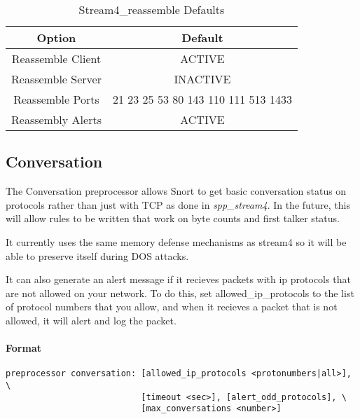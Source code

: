 \documentclass[english]{report}
\begin{document}
%
\begin{table}[!hbpt]

\caption{Stream4\_reassemble Defaults\label{stream4 reassemble defaults}}

\begin{center}\begin{tabular}{|c|c|}
\hline 
Option&
Default\\
\hline
\hline 
Reassemble Client&
ACTIVE\\
\hline 
Reassemble Server&
INACTIVE\\
\hline 
Reassemble Ports&
21 23 25 53 80 143 110 111 513 1433\\
\hline 
Reassembly Alerts&
ACTIVE\\
\hline
\end{tabular}\end{center}
\end{table}



\subsection{Conversation\label{sub:Conversation}}

The Conversation preprocessor allows Snort to get basic conversation
status on protocols rather than just with TCP as done in \emph{spp\_stream4}.
In the future, this will allow rules to be written that work on byte
counts and first talker status. 

It currently uses the same memory defense mechanisms as stream4 so
it will be able to preserve itself during DOS attacks.

It can also generate an alert message if it recieves packets with
ip protocols that are not allowed on your network. To do this, set
allowed\_ip\_protocols to the list of protocol numbers that you allow,
and when it recieves a packet that is not allowed, it will alert and
log the packet.


\paragraph{Format}

\begin{verbatim}
preprocessor conversation: [allowed_ip_protocols <protonumbers|all>], \
                           [timeout <sec>], [alert_odd_protocols], \
                           [max_conversations <number>]

\end{verbatim}
\end{document}
